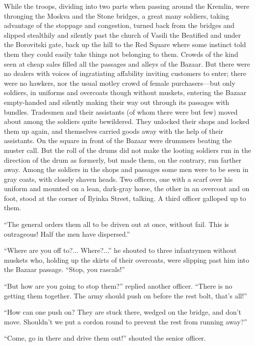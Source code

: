 While the troops, dividing into two parts when passing around the
Kremlin, were thronging the Moskva and the Stone bridges, a great
many soldiers, taking advantage of the stoppage and congestion,
turned back from the bridges and slipped stealthily and silently
past the church of Vasili the Beatified and under the Borovitski
gate, back up the hill to the Red Square where some instinct told
them they could easily take things not belonging to them. Crowds
of the kind seen at cheap sales filled all the passages and
alleys of the Bazaar. But there were no dealers with voices of
ingratiating affability inviting customers to enter; there were
no hawkers, nor the usual motley crowd of female purchasers---but
only soldiers, in uniforms and overcoats though without muskets,
entering the Bazaar empty-handed and silently making their way
out through its passages with bundles. Tradesmen and their
assistants (of whom there were but few) moved about among the
soldiers quite bewildered. They unlocked their shops and locked
them up again, and themselves carried goods away with the help of
their assistants. On the square in front of the Bazaar were
drummers beating the muster call. But the roll of the drums did
not make the looting soldiers run in the direction of the drum as
formerly, but made them, on the contrary, run farther away. Among
the soldiers in the shops and passages some men were to be seen
in gray coats, with closely shaven heads. Two officers, one with
a scarf over his uniform and mounted on a lean, dark-gray horse,
the other in an overcoat and on foot, stood at the corner of
Ilyinka Street, talking. A third officer galloped up to them.

``The general orders them all to be driven out at once, without
fail.  This is outrageous! Half the men have dispersed.''

``Where are you off to?... Where?...'' he shouted to three
infantrymen without muskets who, holding up the skirts of their
overcoats, were slipping past him into the Bazaar
passage. ``Stop, you rascals!''

``But how are you going to stop them?'' replied another
officer. ``There is no getting them together. The army should
push on before the rest bolt, that's all!''

``How can one push on? They are stuck there, wedged on the
bridge, and don't move. Shouldn't we put a cordon round to
prevent the rest from running away?''

``Come, go in there and drive them out!'' shouted the senior
officer.

